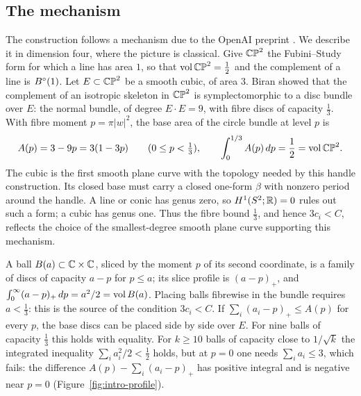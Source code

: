 \subsection{The mechanism}\label{sec:intro-mechanism}

The construction follows a mechanism due to the OpenAI preprint \cite{OpenAI2026}. We describe it in dimension four, where the picture is
classical. Give $\mathbb{CP}^2$ the Fubini--Study form for which a line has area $1$, so that $\operatorname{vol}\mathbb{CP}^2=\frac12$ and the
complement of a line is $B^{\circ}(1)$. Let $E\subset\mathbb{CP}^2$ be a smooth cubic, of area $3$. Biran \cite{Biran2001} showed
that the complement of an isotropic skeleton in $\mathbb{CP}^2$ is symplectomorphic to a disc bundle over $E$: the normal
bundle, of degree $E\cdot E=9$, with fibre discs of capacity $\frac13$. With fibre moment $p=\pi|w|^2$, the base area
of the circle bundle at level $p$ is
\[
 A(p)=3-9p=3(1-3p)\qquad(0\le p<\tfrac13),\qquad \int_0^{1/3}A(p)\,dp=\frac12=\operatorname{vol}\mathbb{CP}^2 .
\]
The cubic is the first smooth plane curve with the topology needed by this handle construction. Its closed base
must carry a closed one-form $\beta$ with nonzero period around the handle. A line or conic has genus zero, so
$H^1(S^2;\mathbb{R})=0$ rules out such a form; a cubic has genus one. Thus the fibre bound $\frac13$, and hence $3c_i<C$,
reflects the choice of the smallest-degree smooth plane curve supporting this mechanism.

A ball $B(a)\subset\mathbb{C}\times\mathbb{C}$, sliced by the moment $p$ of its second coordinate, is a family of discs of capacity
$a-p$ for $p\le a$; its slice profile is $(a-p)_+$, and $\int_0^\infty(a-p)_+\,dp=a^2/2=\operatorname{vol} B(a)$. Placing balls
fibrewise in the bundle requires $a<\frac13$: this is the source of the condition $3c_i<C$. If
$\sum_i(a_i-p)_+\le A(p)$ for every $p$, the base discs can be placed side by side over $E$. For nine balls of
capacity $\frac13$ this holds with equality. For $k\ge10$ balls of capacity close to $1/\sqrt k$ the integrated
inequality $\sum_ia_i^2/2<\frac12$ holds, but at $p=0$ one needs $\sum_ia_i\le3$, which fails: the difference
$A(p)-\sum_i(a_i-p)_+$ has positive integral and is negative near $p=0$ (Figure~\ref{fig:intro-profile}).

